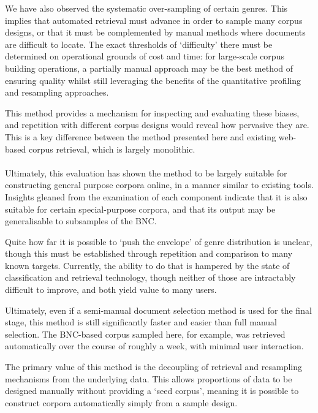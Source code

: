 We have also observed the systematic over-sampling of certain genres.  This implies that automated retrieval must advance in order to sample many corpus designs, or that it must be complemented by manual methods where documents are difficult to locate.  The exact thresholds of `difficulty' there must be determined on operational grounds of cost and time: for large-scale corpus building operations, a partially manual approach may be the best method of ensuring quality whilst still leveraging the benefits of the quantitative profiling and resampling approaches.

This method provides a mechanism for inspecting and evaluating these biases, and repetition with different corpus designs would reveal how pervasive they are.  This is a key difference between the method presented here and existing web-based corpus retrieval, which is largely monolithic.

\paragraph{}

Ultimately, this evaluation has shown the method to be largely suitable for constructing general purpose corpora online, in a manner similar to existing tools.  Insights gleaned from the examination of each component indicate that it is also suitable for certain special-purpose corpora, and that its output may be generalisable to subsamples of the BNC.

Quite how far it is possible to `push the envelope' of genre distribution is unclear, though this must be established through repetition and comparison to many known targets.  Currently, the ability to do that is hampered by the state of classification and retrieval technology, though neither of those are intractably difficult to improve, and both yield value to many users.

Ultimately, even if a semi-manual document selection method is used for the final stage, this method is still significantly faster and easier than full manual selection.  The BNC-based corpus sampled here, for example, was retrieved automatically over the course of roughly a week, with minimal user interaction.

The primary value of this method is the decoupling of retrieval and resampling mechanisms from the underlying data.  This allows proportions of data to be designed manually without providing a `seed corpus', meaning it is possible to construct corpora automatically simply from a sample design.




